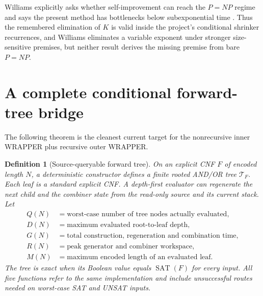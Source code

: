 \documentclass[11pt]{article}
\newtheorem{definition}[theorem]{Definition}
\newcommand{\SAT}{\operatorname{SAT}}
\begin{document}
Williams explicitly asks whether self-improvement can reach the $P=NP$
regime and says the present method has bottlenecks below subexponential time
\cite{williams2024}.  Thus the remembered elimination of $K$ is valid inside
the project's conditional shrinker recurrences, and Williams eliminates a
variable exponent under stronger size-sensitive premises, but neither result
derives the missing premise from bare $P=NP$.

\section{A complete conditional forward-tree bridge}
The following theorem is the cleanest current target for the nonrecursive
inner WRAPPER plus recursive outer WRAPPER.

\begin{definition}[Source-queryable forward tree]
On an explicit CNF $F$ of encoded length $N$, a deterministic constructor
defines a finite rooted AND/OR tree $\mathcal T_F$.  Each leaf is a standard
explicit CNF.  A depth-first evaluator can regenerate the next child and the
combiner state from the read-only source and its current stack.  Let
\begin{align*}
 Q(N)&=\text{worst-case number of tree nodes actually evaluated},\\
 D(N)&=\text{maximum evaluated root-to-leaf depth},\\
 G(N)&=\text{total construction, regeneration and combination time},\\
 R(N)&=\text{peak generator and combiner workspace},\\
 M(N)&=\text{maximum encoded length of an evaluated leaf}.
\end{align*}
The tree is exact when its Boolean value equals $\SAT(F)$ for every input.
All five functions refer to the same implementation and include unsuccessful
routes needed on worst-case SAT and UNSAT inputs.
\end{definition}
\end{document}
